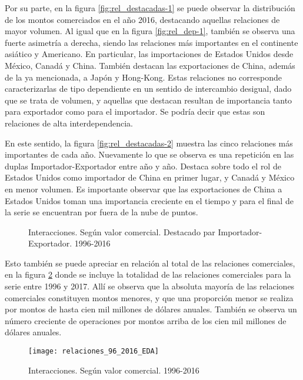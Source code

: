 \documentclass[class=article, crop=false]{standalone}
\begin{document}
Por su parte, en la figura \ref{fig:rel_destacadas-1} se puede observar la distribución de los montos comerciados en el año 2016, destacando aquellas relaciones de mayor volumen. Al igual que en la figura \ref{fig:rel_dep-1}, también se observa una fuerte asimetría a derecha, siendo las relaciones más importantes en el continente asiático y Americano. En particular, las importaciones de Estados Unidos desde México, Canadá y China. También destacan las exportaciones de China, además de la ya mencionada, a Japón y Hong-Kong. Estas relaciones no corresponde caracterizarlas de tipo dependiente en un sentido de intercambio desigual, dado que se trata de volumen, y aquellas que destacan resultan de importancia tanto para exportador como para el importador. Se podría decir que estas son relaciones de alta interdependencia.

En este sentido, la figura \ref{fig:rel_destacadas-2} muestra las cinco relaciones más importantes de cada año. Nuevamente lo que se observa es una repetición en las duplas Importador-Exportador entre año y año. Destaca sobre todo el rol de Estados Unidos como importador de China en primer lugar, y Canadá y México en menor volumen. Es importante observar que las exportaciones de China a Estados Unidos toman una importancia creciente en el tiempo y para el final de la serie se encuentran por fuera de la nube de puntos.


\begin{figure}
	\centering
	\caption{Interacciones. Según valor comercial. Destacado par Importador-Exportador. 1996-2016}
	\label{fig:rel_destacadas}
\end{figure}


Esto también se puede apreciar en relación al total de las relaciones comerciales, en la figura \ref{fig:hexplot} donde se incluye la totalidad de las relaciones comerciales para la serie entre 1996 y 2017. Allí se observa que la absoluta mayoría de las relaciones comerciales constituyen montos menores, y que una proporción menor se realiza por montos de hasta cien mil millones de dólares anuales. También se observa un número creciente de operaciones por montos arriba de los cien mil millones de dólares anuales.

\begin{figure}
	\centering	
	\texttt{[image: relaciones\_96\_2016\_EDA]}
	\caption{Interacciones. Según valor comercial. 1996-2016}
	\label{fig:hexplot}
\end{figure}
\end{document}
